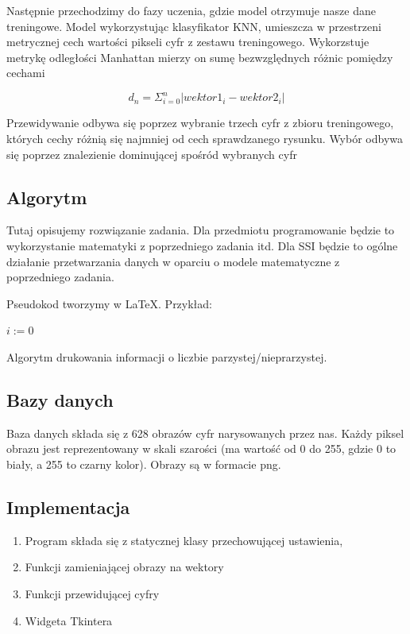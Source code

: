 \documentclass[12pt,a4paper]{article}
\begin{document}
    Następnie przechodzimy do fazy uczenia, gdzie model otrzymuje nasze dane treningowe. 
	Model wykorzystując klasyfikator KNN, umieszcza w przestrzeni metrycznej cech wartości pikseli cyfr 
	z zestawu treningowego. Wykorzstuje metrykę odległości Manhattan mierzy on sumę bezwzględnych różnic pomiędzy cechami

    \[
        d_{n}=\Sigma^{n}_{i=0}|wektor1_{i}-wektor2_{i}|
    \]

    Przewidywanie odbywa się poprzez wybranie trzech cyfr z zbioru treningowego, których cechy różnią się najmniej od cech sprawdzanego rysunku. Wybór odbywa się poprzez znalezienie dominującej spośród wybranych cyfr

	\subsection*{Algorytm}
	Tutaj opisujemy rozwiązanie zadania. Dla przedmiotu programowanie będzie to wykorzystanie matematyki z poprzedniego zadania itd. Dla SSI będzie to ogólne działanie przetwarzania danych w oparciu o modele matematyczne z poprzedniego zadania. 
	
	Pseudokod tworzymy w \LaTeX. Przykład:\\
	\begin{algorithm}[H]
		$i:=0$\;
		\caption{Algorytm drukowania informacji o liczbie parzystej/nieprarzystej.}
	\end{algorithm}

	\subsection*{Bazy danych}
	Baza danych składa się z 628 obrazów cyfr narysowanych przez nas. Każdy piksel obrazu jest reprezentowany w skali
	szarości (ma wartość od 0 do 255, gdzie 0 to biały, a 255 to czarny kolor). Obrazy są w formacie png.
	\subsection*{Implementacja}
    \begin{enumerate}
        \item Program składa się z statycznej klasy przechowującej ustawienia, 
        \item Funkcji zamieniającej obrazy na wektory
        \item Funkcji przewidującej cyfry
        \item Widgeta Tkintera
    \end{enumerate}
    
\end{document}
